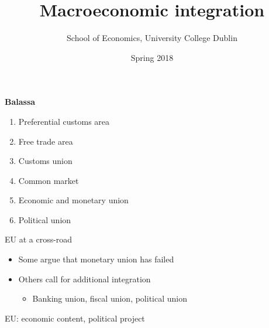 \documentclass{beamer}
\title{Macroeconomic integration}
\author{School of Economics, University College Dublin}
\date{Spring 2018}
\begin{document}
\begin{frame}
 \titlepage
\end{frame}

\begin{frame}
  \textbf{Balassa}
  \begin{enumerate}
    \item Preferential customs area
    \item Free trade area
    \item Customs union
    \item Common market
    \item Economic and monetary union
    \item Political union
  \end{enumerate}
\end{frame}

\begin{frame}
  
\end{frame}

\begin{frame}
  EU at a cross-road
  \begin{itemize}
    \item Some argue that monetary union has failed
    \item Others call for additional integration
    \begin{itemize}
      \item Banking union, fiscal union, political union
    \end{itemize}
  \end{itemize}
  EU: economic content, political project
\end{frame}
\end{document}
